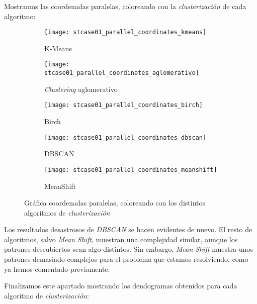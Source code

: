 \documentclass[11pt]{article}
\begin{document}
Mostramos las coordenadas paralelas, coloreando con la \emph{clusterización} de cada algoritmo:

\begin{figure}[H]
    \centering

    \begin{subfigure}[b]{0.45 \textwidth}
        \texttt{[image: stcase01\_parallel\_coordinates\_kmeans]}
        \caption{K-Means}
    \end{subfigure}
    \begin{subfigure}[b]{0.45 \textwidth}
        \texttt{[image: stcase01\_parallel\_coordinates\_aglomerativo]}
        \caption{\emph{Clustering} aglomerativo}
    \end{subfigure}

    \begin{subfigure}[b]{0.45 \textwidth}
        \texttt{[image: stcase01\_parallel\_coordinates\_birch]}
        \caption{Birch}
    \end{subfigure}
    \begin{subfigure}[b]{0.45 \textwidth}
        \texttt{[image: stcase01\_parallel\_coordinates\_dbscan]}
        \caption{DBSCAN}
    \end{subfigure}

    \begin{subfigure}[b]{0.45 \textwidth}
        \texttt{[image: stcase01\_parallel\_coordinates\_meanshift]}
        \caption{MeanShift}
    \end{subfigure}

    \caption{Gráfica coordenadas paralelas, coloreando con los distintos algoritmos de \emph{clusterización}}
\end{figure}

Los resultados desastrosos de \emph{DBSCAN} se hacen evidentes de nuevo. El resto de algoritmos, salvo \emph{Mean Shift}, muestran una complejidad similar, aunque los patrones descubiertos sean algo distintos. Sin embargo, \emph{Mean Shift} muestra unos patrones demasiado complejos para el problema que estamos resolviendo, como ya hemos comentado previamente.

Finalizamos este apartado mostrando los dendogramas obtenidos para cada algoritmo de \emph{clusterización}:
\end{document}
